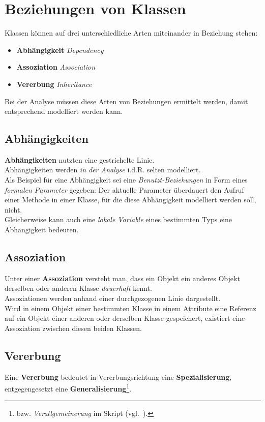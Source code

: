 \section{Beziehungen von Klassen}

Klassen können auf drei unterschiedliche Arten miteinander in Beziehung stehen:

\begin{itemize}
    \item \textbf{Abhängigkeit} \textit{Dependency}
    \item \textbf{Assoziation} \textit{Association}
    \item \textbf{Vererbung} \textit{Inheritance}
\end{itemize}

\noindent
Bei der Analyse müssen diese Arten von Beziehungen ermittelt werden, damit entsprechend modelliert werden kann.\\

\subsection*{Abhängigkeiten}
\textbf{Abhängikeiten} nutzten eine gestrichelte Linie.\\
Abhängigkeiten werden \textit{in der Analyse} i.d.R. selten modelliert.\\
Als Beispiel für eine Abhängigkeit sei eine \textit{Benutzt-Beziehungen} in Form eines \textit{formalen Parameter} gegeben: Der aktuelle Parameter überdauert den Aufruf einer Methode in einer Klasse, für die diese Abhängigkeit modelliert werden soll, nicht.\\
Gleicherweise kann auch eine \textit{lokale Variable} eines bestimmten Typs eine Abhängigkeit bedeuten.

\subsection*{Assoziation}
Unter einer \textbf{Assoziation} versteht man, dass ein Objekt ein anderes Objekt derselben oder anderen Klasse \textit{dauerhaft} kennt.\\
Assoziationen werden anhand einer durchgezogenen Linie dargestellt.\\
Wird in einem Objekt einer bestimmten Klasse in einem Attribute eine Referenz auf ein Objekt einer anderen oder derselben Klasse gespeichert, existiert eine Assoziation zwischen diesen beiden Klassen.

\subsection*{Vererbung}
Eine \textbf{Vererbung} bedeutet in Vererbungsrichtung eine \textbf{Spezialisierung}, entgegengesetzt eine \textbf{Generalisierung}\footnote{
bzw. \textit{Verallgemeinerung} im Skript (vgl.~\cite[7]{Wed09b}).
}.

